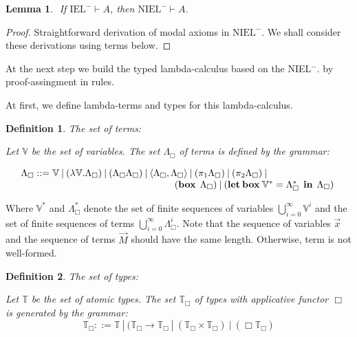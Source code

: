 \documentclass[a4paper]{article}
\newtheorem{lemma}{Lemma}
\newtheorem{defin}{Definition}
\begin{document}
\begin{lemma}
  $ $
  If $\text{IEL}^{-} \vdash A$, then $\text{NIEL}^{-} \vdash A$.
\end{lemma}

\begin{proof}
  Straightforward derivation of modal axioms in $\text{NIEL}^{-}$. We shall consider these derivations using terms below.
\end{proof}

  \vspace{\baselineskip}

  At the next step we build the typed lambda-calculus based on the NIEL$^{-}$.
by proof-assingment in rules.

  At first, we define lambda-terms and types for this lambda-calculus.

  \vspace{\baselineskip}

  \begin{defin} The set of terms:

  Let $\mathbb{V}$ be the set of variables. The set $\Lambda_{\Box}$ of terms is defined by the grammar:

$\begin{array}{lll}
& \Lambda_{\Box} ::= \mathbb{V} \: | \:  (\lambda \mathbb{V}.\Lambda_{\Box}) \: | \: (\Lambda_{\Box} \Lambda_{\Box}) \: | \: \langle \Lambda_{\Box} , \Lambda_{\Box} \rangle \: | \: (\pi_1 \Lambda_{\Box}) \: | \: (\pi_2 \Lambda_{\Box}) \: | & \\
& \quad\quad\quad\quad\quad\quad\quad\quad\quad\quad\quad\quad\quad\quad\quad\quad ({\bf box \: } \:\Lambda_{\Box}) \: | \: ({\bf let \: box \:} \mathbb{V}^{*} = \Lambda_{\Box}^{*} \:\: {\bf in} \:\: \Lambda_{\Box})
\end{array}$

  \end{defin}

Where $\mathbb{V}^{*}$ and $\Lambda_{\Box}^{*}$ denote the set of finite sequences of variables $\bigcup \limits_{i=0}^{\infty} \mathbb{V}^i$
and the set of finite sequences of terms $\bigcup \limits_{i = 0}^{\infty} \Lambda_{\Box}^i $. Note that the sequence of variables $\vec{x}$ and the sequence of terms $\vec{M}$ should have the same length.
Otherwise, term is not well-formed.

  \begin{defin} The set of types:

  Let $\mathbb{T}$ be the set of atomic types. The set $\mathbb{T}_{\Box}$ of types with applicative
  functor $\Box$ is generated by the grammar:
  \begin{equation}
    \mathbb{T}_{\Box} ::= \mathbb{T} \: | \: (\mathbb{T}_{\Box} \to \mathbb{T}_{\Box} \: |
    \: (\mathbb{T}_{\Box} \times \mathbb{T}_{\Box}) \: | \: (\Box \mathbb{T}_{\Box})
  \end{equation}
  \end{defin}
\end{document}
